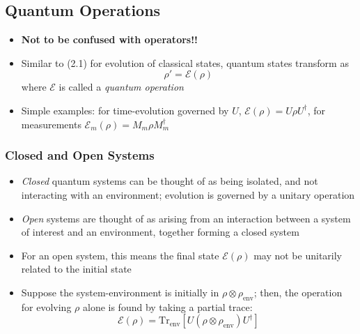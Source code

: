 \documentclass[12pt,a4paper]{article}
\numberwithin{equation}{section}
\begin{document}
	\subsection{Quantum Operations}
	\begin{itemize}
		\item \textbf{Not to be confused with operators!!}
		\item Similar to (2.1) for evolution of classical states, quantum states transform as
		\begin{equation} \label{Quantum operation}
			\rho'=\mathcal{E}(\rho)
		\end{equation}
		where $\mathcal{E}$ is called a \textit{quantum operation}
		\item Simple examples: for time-evolution governed by $U$, $\mathcal{E}(\rho)=U\rho U^{\dagger}$, for measurements $\mathcal{E}_{m}(\rho)=M_{m}\rho M_{m}^{\dagger}$
	\end{itemize}
	\subsubsection{Closed and Open Systems}
	\begin{itemize}
		\item \textit{Closed} quantum systems can be thought of as being isolated, and not interacting with an environment; evolution is governed by a unitary operation
		\item \textit{Open} systems are thought of as arising from an interaction between a system of interest and an environment, together forming a closed system
		\item For an open system, this means the final state $\mathcal{E}(\rho)$ may not be unitarily related to the initial state
		\item Suppose the system-environment is initially in $\rho\otimes\rho_{\text{env}}$; then, the operation for evolving $\rho$ alone is found by taking a partial trace:
		\begin{equation} \label{Operation for open system}
			\mathcal{E}(\rho)=\text{Tr}_{\text{env}}\left[U(\rho\otimes\rho_{\text{env}})U^{\dagger}\right]
		\end{equation}
	\end{itemize}
\end{document}
